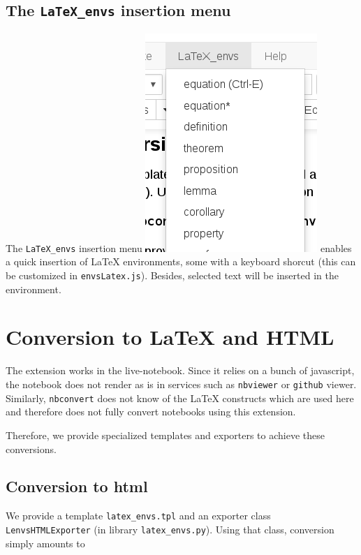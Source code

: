     \subsection{\texorpdfstring{The \texttt{LaTeX\_envs} insertion
menu}{The LaTeX\_envs insertion menu}}\label{the-latexux5fenvs-insertion-menu}

The \texttt{LaTeX\_envs} insertion menu
\includegraphics{LaTeX_envs_menu.png} enables a quick insertion of LaTeX
environments, some with a keyboard shorcut (this can be customized in
\texttt{envsLatex.js}). Besides, selected text will be inserted in the
environment.

    \section{Conversion to LaTeX and
HTML}\label{conversion-to-latex-and-html}

    The extension works in the live-notebook. Since it relies on a bunch of
javascript, the notebook does not render as is in services such as
\texttt{nbviewer} or \texttt{github} viewer. Similarly,
\texttt{nbconvert} does not know of the LaTeX constructs which are used
here and therefore does not fully convert notebooks using this
extension.

Therefore, we provide specialized templates and exporters to achieve
these conversions.

    \subsection{Conversion to html}\label{conversion-to-html}

We provide a template \texttt{latex\_envs.tpl} and an exporter class
\texttt{LenvsHTMLExporter} (in library \texttt{latex\_envs.py}). Using
that class, conversion simply amounts to

